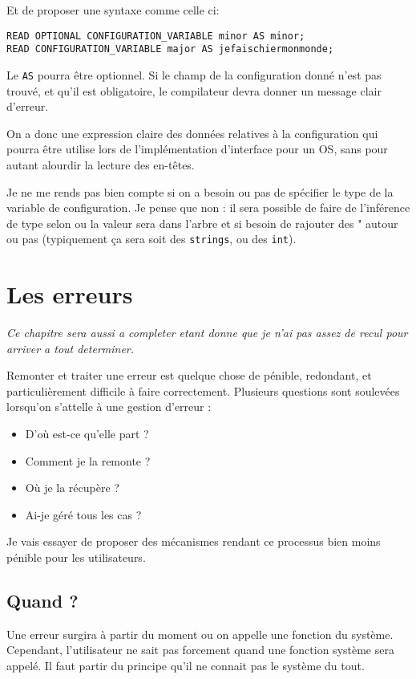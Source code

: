 \documentclass{rtxreport}
\begin{document}
Et de proposer une syntaxe comme celle ci:

\begin{lstlisting}
READ OPTIONAL CONFIGURATION_VARIABLE minor AS minor;
READ CONFIGURATION_VARIABLE major AS jefaischiermonmonde;
\end{lstlisting}
Le \texttt{AS} pourra être optionnel. Si le champ de la configuration donné n’est pas trouvé, et qu’il est obligatoire, le compilateur devra donner un message clair d’erreur.

On a donc une expression claire des données relatives à la configuration qui pourra être utilise lors de l’implémentation d’interface pour un OS, sans pour autant alourdir la lecture des en-têtes.

Je ne me rends pas bien compte si on a besoin ou pas de spécifier le type de la variable de configuration. Je pense que non : il sera possible de faire de l’inférence de type selon ou la valeur sera dans l’arbre et si besoin de rajouter des " autour ou pas (typiquement ça sera soit des \texttt{strings}, ou des \texttt{int}).

\chapter{Les erreurs}

\emph{Ce chapitre sera aussi a completer etant donne que je n'ai pas assez de recul pour arriver a tout determiner.}

Remonter et traiter une erreur est quelque chose de pénible, redondant, et particulièrement difficile à faire correctement. Plusieurs questions sont soulevées lorsqu’on s’attelle à une gestion d’erreur :
\begin{itemize}
	\item D’où est-ce qu’elle part ?
	\item Comment je la remonte ?
	\item Où je la récupère ?
	\item Ai-je géré tous les cas ?
\end{itemize}

Je vais essayer de proposer des mécanismes rendant ce processus bien moins pénible pour les utilisateurs.

\section{Quand ?}
Une erreur surgira à partir du moment ou on appelle une fonction du système. Cependant, l’utilisateur ne sait pas forcement quand une fonction système sera appelé. Il faut partir du principe qu’il ne connait pas le système du tout.
\end{document}
